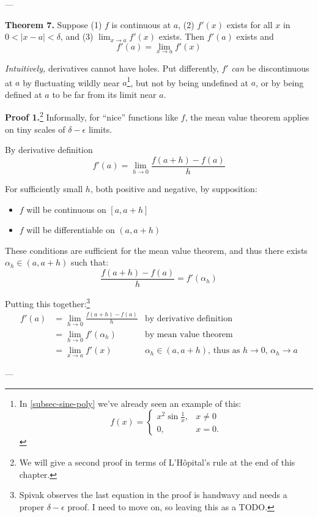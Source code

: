 ---\vs

\textbf{Theorem 7.} Suppose (1) $f$ is continuous at $a$, (2) $f'(x)$
exists for all $x$ in $0<|x-a|<\delta$, and (3) $\lim_{x\to a}f'(x)$ exists.
Then $f'(a)$ exists and
\[f'(a)=\lim_{x\to a}f'(x)\]

\textit{Intuitively,} derivatives cannot have holes. Put differently,
$f'$ \textit{can} be discontinuous at $a$ by fluctuating wildly near
$a$\footnote{In \ref{subsec-sine-poly} we've already seen an example
  of this:
  \[f(x)=\begin{cases}
    x^2\sin \frac{1}{x},&x\neq0\\
    0,&x=0.
  \end{cases}\]}, but
not by being undefined at $a$, or by being defined at $a$ to be far from its limit
near $a$.

\vs

\textbf{Proof 1.}\footnote{We will give a second proof in terms of
  L'H\^opital's rule at the end of this chapter.} Informally, for
``nice'' functions like $f$, the mean value theorem applies on tiny
scales of $\delta-\epsilon$ limits.

\vs

By derivative definition
\[f'(a)=\lim_{h\to 0}\frac{f(a+h)-f(a)}{h}\]

For sufficiently small $h$, both positive and negative, by supposition:
\begin{itemize}
\item $f$ will be continuous on $[a,a+h]$
\item $f$ will be differentiable on $(a,a+h)$
\end{itemize}

These conditions are sufficient for the mean value theorem, and thus
there exists $\alpha_h\in(a, a+h)$ such that:
\[\frac{f(a+h)-f(a)}{h}=f'(\alpha_h)\]

Putting this together:\footnote{Spivak observes the last equation in
  the proof is handwavy and needs a proper $\delta-\epsilon$ proof. I need to move
  on, so leaving this as a TODO.}
\begin{align*}
  f'(a)&=\lim_{h\to0}\frac{f(a+h)-f(a)}{h}&\text{by derivative definition}\\
       &=\lim_{h\to0}f'(\alpha_h)&\text{by mean value theorem}\\
       &=\lim_{x\to a}f'(x)&\text{$\alpha_h\in(a,a+h)$, thus as $h\to0$, $\alpha_h\to a$}
\end{align*}

\vs---\vs

